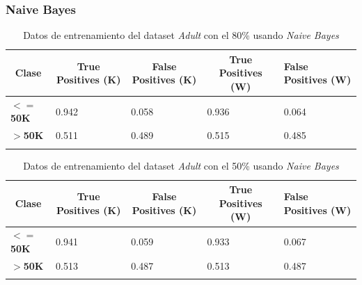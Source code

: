 \documentclass[10pt,a4paper]{article}
\begin{document}
\subsubsection{Naive Bayes}
\begin{table}[h]
\begin{tabular}{lllll}
\hline
\multicolumn{1}{|c|}{\textbf{Clase}} & \multicolumn{1}{c|}{\textbf{True Positives (K)}} & \multicolumn{1}{c|}{\textbf{False Positives (K)}} & \multicolumn{1}{c|}{\textbf{True Positives (W)}} & \multicolumn{1}{l|}{\textbf{False Positives (W)}} \\ \hline
\multicolumn{1}{|l|}{\textbf{$<=$50K}} & \multicolumn{1}{l|}{0.942}          & \multicolumn{1}{l|}{0.058}          & \multicolumn{1}{l|}{0.936}          & \multicolumn{1}{l|}{0.064} \\ \hline
\multicolumn{1}{|l|}{\textbf{$>$50K}} & \multicolumn{1}{l|}{0.511}          & \multicolumn{1}{l|}{0.489}          & \multicolumn{1}{l|}{0.515}          & \multicolumn{1}{l|}{0.485} \\ \hline
\textbf{}                       &                                &                                &                                &                      
\end{tabular}
\caption{Datos de entrenamiento del dataset \emph{Adult} con el 80\% usando \emph{Naive Bayes}}
\label{tab:adult_bayes_80}
\end{table}

\begin{table}[h]
\begin{tabular}{lllll}
\hline
\multicolumn{1}{|c|}{\textbf{Clase}} & \multicolumn{1}{c|}{\textbf{True Positives (K)}} & \multicolumn{1}{c|}{\textbf{False Positives (K)}} & \multicolumn{1}{c|}{\textbf{True Positives (W)}} & \multicolumn{1}{l|}{\textbf{False Positives (W)}} \\ \hline
\multicolumn{1}{|l|}{\textbf{$<=$50K}} & \multicolumn{1}{l|}{0.941}          & \multicolumn{1}{l|}{0.059}          & \multicolumn{1}{l|}{0.933}          & \multicolumn{1}{l|}{0.067} \\ \hline
\multicolumn{1}{|l|}{\textbf{$>$50K}} & \multicolumn{1}{l|}{0.513}          & \multicolumn{1}{l|}{0.487}          & \multicolumn{1}{l|}{0.513}          & \multicolumn{1}{l|}{0.487} \\ \hline
\textbf{}                       &                                &                                &                                &                      
\end{tabular}
\caption{Datos de entrenamiento del dataset \emph{Adult} con el 50\% usando \emph{Naive Bayes}}
\label{tab:adult_bayes_50}
\end{table}
\end{document}
